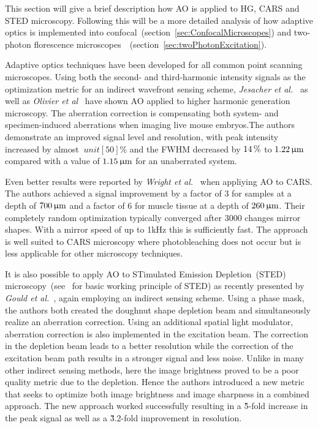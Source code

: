 This section will give a brief description how AO is applied to HG, CARS and STED microscopy. Following this will be a more detailed analysis of how adaptive optics is implemented into confocal~(section~\ref{sec:ConfocalMicroscopes}) and two-photon florescence microscopes~~(section~\ref{sec:twoPhotonExcitation}). 

Adaptive optics techniques have been developed for all common point scanning microscopes. Using both the second- and third-harmonic intensity signals as the optimization metric for an indirect wavefront sensing scheme, \emph{Jesacher et al.}~\cite{scan_HG_dynamic} as well as \emph{Olivier et al}~\cite{scan_HG_embryos} have shown AO applied to higher harmonic generation microscopy. The aberration correction is compensating both system- and specimen-induced aberrations when imaging live mouse embryos.The authors demonstrate an improved signal level and resolution, with peak intensity increased by almost $\ unit[50]{\%}$ and the FWHM decreased by $\unit[14]{\%}$ to  $\unit[1.22]{\upmu m}$ compared with a value of $\unit[1.15]{\upmu m}$ for an unaberrated system.

Even better results were reported by \emph{Wright et al.}~\cite{scan_CARS} when appliying AO to CARS. The authors achieved a signal improvement by a factor of 3 for samples at a depth of $\unit[700]{\upmu m}$ and a factor of 6 for muscle tissue at a depth of $\unit[260]{\upmu m}$. Their completely random optimization typically converged after 3000 changes mirror shapes. With a mirror speed of up to 1kHz this is sufficiently fast.  The approach is well suited to CARS microscopy where photobleaching does not occur but is less applicable for other microscopy techniques. 

It is also possible to apply AO to STimulated Emission Depletion~(STED) microscopy~(see~\cite{scan_STED_principle} for basic working principle of STED) as recently presented by \emph{Gould et al.}~\cite{scan_STED}, again employing an indirect sensing scheme. Using a phase mask, the authors both created the doughnut shape depletion beam and simultaneously realize an aberration correction. Using an additional spatial light modulator, aberration correction is also implemented in the  excitation beam. The correction in the depletion beam leads to a better resolution while the correction of the excitation beam path results in a stronger signal and less noise. Unlike in many other indirect sensing methods, here the image brightness proved to be a poor quality metric due to the depletion. Hence the authors  introduced a new metric that seeks to optimize both image brightness and image sharpness in a combined approach. The new approach worked successfully resulting in a \~5-fold increase in the peak signal as well as a \~3.2-fold improvement in resolution.


